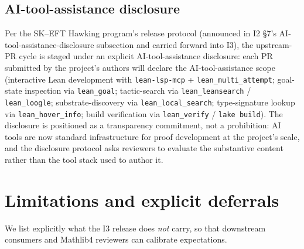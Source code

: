 \documentclass[11pt]{article}
\begin{document}
\subsection{AI-tool-assistance disclosure}

Per the SK--EFT Hawking program's release protocol
(announced in I2 §7's AI-tool-assistance-disclosure subsection
and carried forward into I3), the
upstream-PR cycle is staged under an explicit AI-tool-assistance
disclosure: each PR submitted by the project's authors will declare
the AI-tool-assistance scope (interactive Lean development with
\texttt{lean-lsp-mcp} + \texttt{lean\_multi\_attempt}; goal-state
inspection via \texttt{lean\_goal}; tactic-search via
\texttt{lean\_leansearch} / \texttt{lean\_loogle}; substrate-discovery
via \texttt{lean\_local\_search}; type-signature lookup via
\texttt{lean\_hover\_info}; build verification via
\texttt{lean\_verify} / \texttt{lake build}). The disclosure is
positioned as a transparency commitment, not a prohibition: AI tools
are now standard infrastructure for proof development at the project's
scale, and the disclosure protocol asks reviewers to evaluate the
substantive content rather than the tool stack used to author it.


\section{Limitations and explicit deferrals}
\label{sec:limitations}

We list explicitly what the I3 release does \emph{not} carry, so that
downstream consumers and Mathlib4 reviewers can calibrate expectations.
\end{document}
